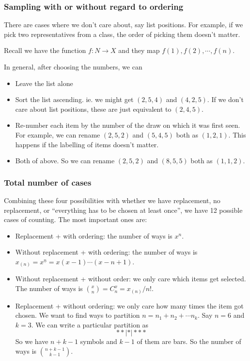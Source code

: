 \documentclass[a4paper]{article}
\begin{document}
\subsubsection*{Sampling with or without regard to ordering}
There are cases where we don't care about, say list positions. For example, if we pick two representatives from a class, the order of picking them doesn't matter.

Recall we have the function $f: N\to X$ and they map $f(1), f(2), \cdots, f(n)$.

In general, after choosing the numbers, we can
\begin{itemize}
  \item Leave the list alone
  \item Sort the list ascending. ie. we might get $(2, 5, 4)$ and $(4, 2, 5)$. If we don't care about list positions, these are just equivalent to $(2, 4, 5)$.
  \item Re-number each item by the number of the draw on which it was first seen. For example, we can rename $(2, 5, 2)$ and $(5, 4, 5)$ both as $(1, 2, 1)$. This happens if the labelling of items doesn't matter.
  \item Both of above. So we can rename $(2, 5, 2)$ and $(8, 5, 5)$ both as $(1, 1, 2)$.
\end{itemize}

\subsubsection*{Total number of cases}
Combining these four possibilities with whether we have replacement, no replacement, or ``everything has to be chosen at least once'', we have 12 possible cases of counting. The most important ones are:
\begin{itemize}
  \item Replacement + with ordering: the number of ways is $x^n$.
  \item Without replacement + with ordering: the number of ways is $x_{(n)} = x^{\underline{n}} = x(x - 1)\cdots (x - n + 1)$.
  \item Without replacement + without order: we only care which items get selected. The number of ways is $\binom{x}{n} = C^x_n = x_{(n)}/n!$.
  \item Replacement + without ordering: we only care how many times the item got chosen. We want to find ways to partition $n = n_1 + n_2 + \cdots n_k$. Say $n = 6$ and $k = 3$. We can write a particular partition as
    \[
      **|*|***
    \]
  So we have $n + k - 1$ symbols and $k - 1$ of them are bars. So the number of ways is $\binom{n + k - 1}{k - 1}$.
\end{itemize}
\end{document}
